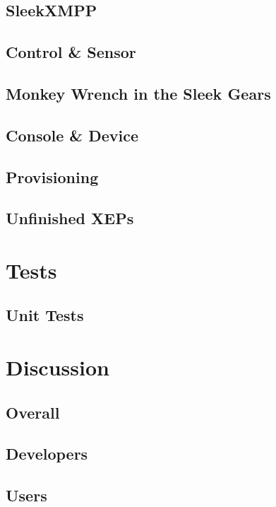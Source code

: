 \documentclass{sig-alternate}
\begin{document}
\subsection{SleekXMPP}

\subsection{Control \& Sensor}

\subsection{Monkey Wrench in the Sleek Gears}

\subsection{Console \& Device}

\subsection{Provisioning}

\subsection{Unfinished XEPs}

\section{Tests}

\subsection{Unit Tests}

\section{Discussion}

\subsection{Overall}

\subsection{Developers}

\subsection{Users}
\end{document}
